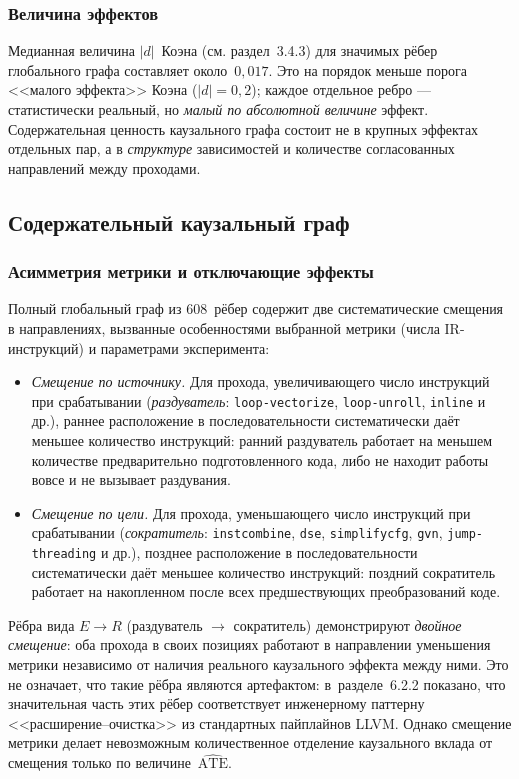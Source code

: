 \subsubsection{Величина эффектов}

Медианная величина $|d|$~Коэна (см. раздел~3.4.3) для значимых рёбер глобального графа составляет около~$0{,}017$. Это на порядок меньше порога <<малого эффекта>> Коэна ($|d| = 0{,}2$); каждое отдельное ребро --- статистически реальный, но \emph{малый по абсолютной величине} эффект. Содержательная ценность каузального графа состоит не в крупных эффектах отдельных пар, а в \emph{структуре} зависимостей и количестве согласованных направлений между проходами.

\subsection{Содержательный каузальный граф}

\subsubsection{Асимметрия метрики и отключающие эффекты}

Полный глобальный граф из 608~рёбер содержит две систематические смещения в направлениях, вызванные особенностями выбранной метрики (числа IR-инструкций) и параметрами эксперимента:

\begin{itemize}
    \item \emph{Смещение по источнику.} Для прохода, увеличивающего число инструкций при срабатывании (\emph{раздуватель}: \texttt{loop-vectorize}, \texttt{loop-unroll}, \texttt{inline} и др.), раннее расположение в последовательности систематически даёт меньшее количество инструкций: ранний раздуватель работает на меньшем количестве предварительно подготовленного кода, либо не находит работы вовсе и не вызывает раздувания.
    \item \emph{Смещение по цели.} Для прохода, уменьшающего число инструкций при срабатывании (\emph{сократитель}: \texttt{instcombine}, \texttt{dse}, \texttt{simplifycfg}, \texttt{gvn}, \texttt{jump-threading} и др.), позднее расположение в последовательности систематически даёт меньшее количество инструкций: поздний сократитель работает на накопленном после всех предшествующих преобразований коде.
\end{itemize}

Рёбра вида $E \to R$ (раздуватель $\to$ сократитель) демонстрируют \emph{двойное смещение}: оба прохода в своих позициях работают в направлении уменьшения метрики независимо от наличия реального каузального эффекта между ними. Это не означает, что такие рёбра являются артефактом: в~разделе~6.2.2 показано, что значительная часть этих рёбер соответствует инженерному паттерну <<расширение--очистка>> из стандартных пайплайнов LLVM. Однако смещение метрики делает невозможным количественное отделение каузального вклада от смещения только по величине~$\widehat{\text{ATE}}$.

